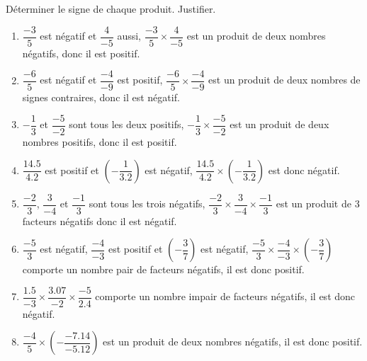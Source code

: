 \begin{corrige}
    Déterminer le signe de chaque produit. Justifier.

    {\red 
        \begin{spacing}{1.5}
            \begin{enumerate}
                \item $\dfrac{-3}{5}$ est négatif et $\dfrac{4}{-5}$ aussi, $\dfrac{-3}{5}\times\dfrac{4}{-5}$ est un produit de deux nombres négatifs, donc il est positif.
                \item $\dfrac{-6}{5}$ est négatif et $\dfrac{-4}{-9}$ est positif, $\dfrac{-6}{5}\times\dfrac{-4}{-9}$ est un produit de deux nombres de signes contraires, donc il est négatif.
                \item $-\dfrac{1}{3}$ et $\dfrac{-5}{-2}$ sont tous les deux positifs, $-\dfrac{1}{3}\times\dfrac{-5}{-2}$ est un produit de deux nombres positifs, donc il est positif.
                \item $\dfrac{\num{14.5}}{\num{4.2}}$ est positif et $\left(-\dfrac{1}{\num{3.2}}\right)$ est négatif, $\dfrac{\num{14.5}}{\num{4.2}}\times\left(-\dfrac{1}{\num{3.2}}\right)$ est donc négatif.
                \item $\dfrac{-2}{3}$, $\dfrac{3}{-4}$ et $\dfrac{-1}{3}$ sont tous les trois négatifs, $\dfrac{-2}{3}\times\dfrac{3}{-4}\times\dfrac{-1}{3}$ est un produit de 3 facteurs négatifs donc il est négatif.
                \item $\dfrac{-5}{3}$ est négatif, $\dfrac{-4}{-3}$ est positif et $\left(-\dfrac{3}{7}\right)$ est négatif, $\dfrac{-5}{3}\times\dfrac{-4}{-3}\times\left(-\dfrac{3}{7}\right)$ comporte un nombre pair de facteurs négatifs, il est donc positif.
                \item $\dfrac{\num{1.5}}{-3}\times\dfrac{\num{3.07}}{-2}\times\dfrac{-5}{\num{2.4}}$ comporte un nombre impair de facteurs négatifs, il est donc négatif.
                \item $\dfrac{-4}{5}\times\left(-\dfrac{\num{-7.14}}{\num{-5.12}}\right)$ est un produit de deux nombres négatifs, il est donc positif.
            \end{enumerate}
        \end{spacing}
    }
\end{corrige}

